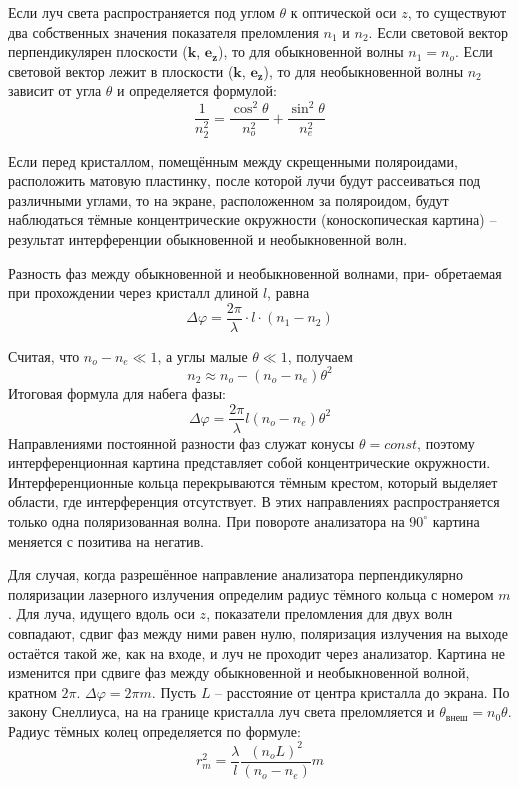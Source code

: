 Если луч света распространяется под углом $\theta$ к оптической оси $z$, то существуют два собственных значения показателя преломления $n_1$ и $n_2$. Если световой вектор перпендикулярен плоскости ($\boldsymbol{k}$, $\boldsymbol{e_z}$), то для обыкновенной волны $n_1 = n_o$.  Если световой вектор лежит в плоскости ($\boldsymbol{k}$, $\boldsymbol{e_z}$), то для необыкновенной волны $n_2$ зависит от угла $\theta$ и определяется формулой:
$$
\frac{1}{n_2^2} = \frac{\cos^2 \theta}{n_o^2} + \frac{\sin^2 \theta}{n_e^2}
$$

Если перед кристаллом, помещённым между скрещенными поляроидами, расположить матовую пластинку, после которой лучи будут рассеиваться под различными углами, то на экране, расположенном за поляроидом, будут наблюдаться тёмные концентрические окружности (коноскопическая картина) -- результат интерференции обыкновенной и необыкновенной волн.

Разность фаз между обыкновенной и необыкновенной волнами, при-
обретаемая при прохождении через кристалл длиной $l$, равна
$$
\Delta \varphi = \frac{2 \pi}{\lambda} \cdot l \cdot (n_1 - n_2)
$$

Считая, что $n_o - n_e \ll 1$, а углы малые $\theta \ll 1$, получаем
$$
n_2 \approx n_o - (n_o - n_e) \theta^2
$$
Итоговая формула для набега фазы:
$$
\Delta \varphi = \frac{2 \pi}{\lambda} l (n_o - n_e) \theta^2
$$
Направлениями постоянной разности фаз служат конусы $\theta = const$,
поэтому интерференционная картина представляет собой концентрические окружности. Интерференционные кольца перекрываются тёмным крестом, который выделяет области, где интерференция отсутствует. В этих направлениях распространяется только одна поляризованная волна. При повороте анализатора на $90^\circ$ картина меняется с позитива на негатив.

Для случая, когда разрешённое направление анализатора перпендикулярно поляризации лазерного излучения определим радиус тёмного кольца с номером $m$. Для луча, идущего вдоль оси $z$, показатели преломления для двух волн совпадают, сдвиг фаз между ними равен нулю, поляризация излучения на выходе остаётся такой же, как на входе, и луч не проходит через анализатор. Картина не изменится при сдвиге фаз между обыкновенной и необыкновенной волной, кратном $2\pi$. $\Delta \varphi = 2 \pi m$. Пусть $L$ -- расстояние от центра кристалла до экрана. По закону Снеллиуса, на на границе кристалла луч света преломляется и $\theta_{внеш} = n_0 \theta$. Радиус тёмных колец определяется по формуле: \\
$$
r_m^2 = \frac{\lambda}{l} \frac{(n_o L)^2}{(n_o - n_e)} m
$$

